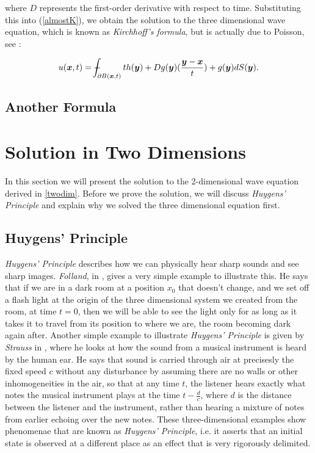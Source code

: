 \documentclass[a4paper, 12pt]{article}
\def\Xint#1{\mathchoice
{\XXint\displaystyle\textstyle{#1}}%
{\XXint\textstyle\scriptstyle{#1}}%
{\XXint\scriptstyle\scriptscriptstyle{#1}}%
{\XXint\scriptscriptstyle\scriptscriptstyle{#1}}%
\!\int}
\def\XXint#1#2#3{{\setbox0=\hbox{$#1{#2#3}{\int}$ }
\vcenter{\hbox{$#2#3$ }}\kern-.6\wd0}}
\def\dashint{\Xint-}
\numberwithin{equation}{section}
\begin{document}
where $D$ represents the first-order derivative with respect to time. Substituting this into (\ref{almostK}), we obtain the solution to the three dimensional wave equation, which is known as \emph{Kirchhoff's formula}, but is 
actually due to Poisson, see \cite{Str}:

\begin{equation*}
    u(\boldsymbol{x},t)=\dashint_{\partial B(\boldsymbol{x},t)}{th(\boldsymbol{y})+Dg(\boldsymbol{y})(\frac{\boldsymbol{y}-\boldsymbol{x}}{t})+g(\boldsymbol{y})dS(\boldsymbol{y})}.
\end{equation*}

\subsection{Another Formula}


\section{Solution in Two Dimensions}
In this section we will present the solution to the 2-dimensional wave equation derived in \ref{twodim}. Before we prove the solution, we will discuss \emph{Huygens' 
Principle} and explain why we solved the three dimensional equation first.

\subsection{Huygens' Principle}
\emph{Huygens' Principle} describes how we can physically hear sharp sounds and see sharp images. \emph{Folland}, in \cite{Fol}, gives a very simple example to illustrate 
this. He says that if we are in a dark room at a position $x_0$ that doesn't change, and we set off a flash light at the origin of the three dimensional system we 
created from the room, at time $t=0$, then we will be able to see the light only for as long as it takes it to travel from its position to where we are, the room
becoming dark again after. Another simple example to illustrate \emph{Huygens' Principle} is given by \emph{Strauss} in \cite{Str}, where he looks at how the sound
from a musical instrument is heard by the human ear. He says that sound is carried through air at precisesly the fixed speed $c$ without any disturbance by assuming
there are no walls or other inhomogeneities in the air, so that at any time $t$, the listener hears exactly what notes the musical instrument plays at the time $t-\frac{d}{c}$,
where $d$ is the distance between the listener and the instrument, rather than hearing a mixture of notes from earlier echoing over the new notes. These three-dimensional 
examples show phenomenae that are known as \emph{Huygens' Principle}, i.e. it asserts that an initial state is observed at a different place as an effect that is 
very rigorously delimited. \cite{Hil} 
\\
\end{document}
